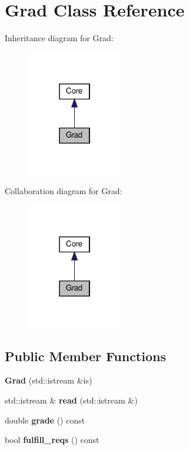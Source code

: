 \hypertarget{classGrad}{}\section{Grad Class Reference}
\label{classGrad}


Inheritance diagram for Grad\+:\nopagebreak
\begin{figure}[H]
\begin{center}
\leavevmode
\includegraphics[width=118pt]{classGrad__inherit__graph}
\end{center}
\end{figure}


Collaboration diagram for Grad\+:\nopagebreak
\begin{figure}[H]
\begin{center}
\leavevmode
\includegraphics[width=118pt]{classGrad__coll__graph}
\end{center}
\end{figure}
\subsection*{Public Member Functions}
\begin{DoxyCompactItemize}
\item 
\mbox{\label{classGrad_a683d203e0526d3926007681b7af7b0e5}} 
{\bfseries Grad} (std\+::istream \&is)
\item 
\mbox{\label{classGrad_ae3f9ebe99dfaa4ae86a87e457ae7a283}} 
std\+::istream \& {\bfseries read} (std\+::istream \&)
\item 
\mbox{\label{classGrad_aa481be2e8f7e4c16942221cd4931b431}} 
double {\bfseries grade} () const
\item 
\mbox{\label{classGrad_ae2bae0e60fbce15836f55a90d0fc2c0e}} 
bool {\bfseries fulfill\+\_\+reqs} () const
\end{DoxyCompactItemize}

